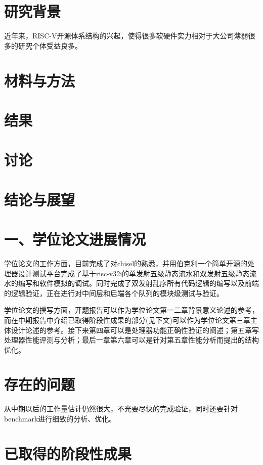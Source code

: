 \documentclass[11pt]{article}
\begin{document}
\section{研究背景}
近年来，RISC-V开源体系结构的兴起，使得很多软硬件实力相对于大公司薄弱很多的研究个体受益良多。
\section{材料与方法}
\section{结果}
\section{讨论}
\section{结论与展望}
\section*{\huge{一、学位论文进展情况}}
学位论文的工作方面，目前完成了对chisel的熟悉，并用伯克利一个简单开源的处理器设计测试平台完成了基于risc-v32i的单发射五级静态流水和双发射五级静态流水的编写和软件模拟的调试。同时完成了双发射乱序所有代码逻辑的编写以及前端的逻辑验证，正在进行对中间层和后端各个队列的模块级测试与验证。

学位论文的撰写方面，开题报告可以作为学位论文第一二章背景意义论述的参考，而在中期报告中介绍已取得阶段性成果的部分(见下文)可以作为学位论文第三章主体设计论述的参考。接下来第四章可以是处理器功能正确性验证的阐述；第五章写处理器性能评测与分析；最后一章第六章可以是针对第五章性能分析而提出的结构优化。
\section*{\LARGE{存在的问题}}
从中期以后的工作量估计仍然很大，不光要尽快的完成验证，同时还要针对benchmark进行细致的分析、优化。
\section*{\LARGE{已取得的阶段性成果}}
\end{document}
